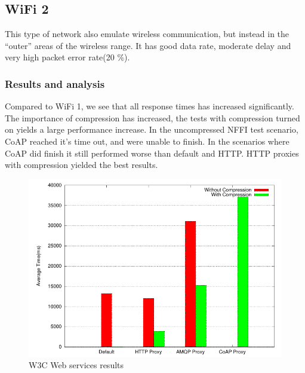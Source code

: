 \subsection{WiFi 2}

This type of network also emulate wireless communication, but instead in the
``outer'' areas of the wireless range. It has good data rate, moderate delay
and very high packet error rate(20 \%).


\subsubsection{Results and analysis}

Compared to WiFi 1, we see that all response times has increased
significantly. The importance of compression has increased, the tests with
compression turned on yields a large performance increase. In the uncompressed
NFFI test scenario, CoAP reached it's time out, and were unable to finish. In
the scenarios where CoAP did finish it still performed worse than default and
HTTP. HTTP proxies with compression yielded the best results.

\begin{figure}[H]
\center
\includegraphics[scale=0.75]{../results/wifi2/nffi/result.pdf}
\caption{W3C Web services results}
\end{figure}

